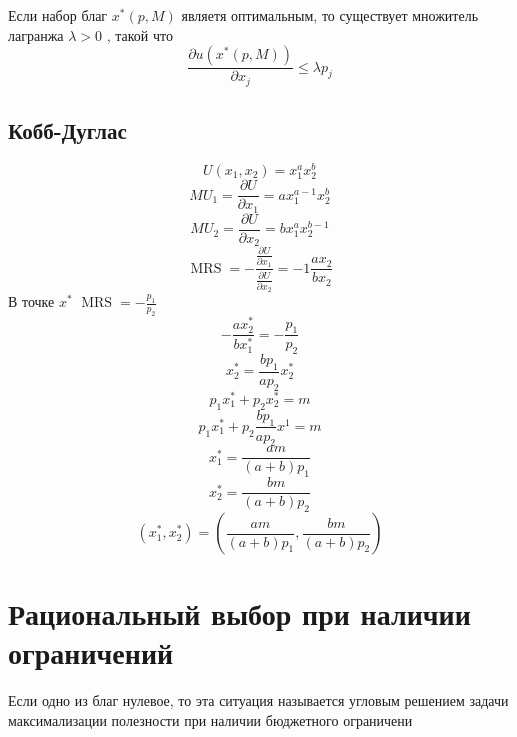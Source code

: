 \documentclass[14pt]{extarticle}
\DeclareMathOperator{\mrs}{MRS}
\begin{document}
 Если набор благ $x^{*}(p,M)$ 
 являетя оптимальным, то существует множитель лагранжа
 $\lambda > 0$ , такой что
  \begin{equation}
	  \frac{\partial u(x^{*}(p,M))}{\partial x_{j}} \le  \lambda p_{j}
 \end{equation} 
 \subsection{Кобб-Дуглас}
 \begin{equation}
 U(x_1,x_2) = x_1^{a} x_2^{b}
 \end{equation} 
 \begin{equation}
 M U_{1} = \frac{\partial U }{\partial x_1} = a x_1^{a- 1} x_2^{b}
 \end{equation} 
 \begin{equation}
 MU_2 = \frac{\partial U}{\partial x_2} = bx_1^{a} x_2^{b-1}
 \end{equation} 
 \begin{equation}
 \mrs = - \frac{\frac{\partial U}{\partial x_1}}{\frac{\partial U}{\partial x_2}} = -1\frac{ax_2}{bx_2}
 \end{equation} 
 В точке $x^{*}$ $\mrs = - \frac{p_1}{p_2}$ 
 \begin{equation}
 - \frac{a x_{2}^{*}}{b x_{1}^{*}} = -\frac{p_1}{p_2}
 \end{equation} 
 \begin{equation}
 x^{*}_{2} = \frac{b p_1}{a p_2} x_2^{*}
 \end{equation} 
 \begin{equation}
 p_1 x_1^{*} + p_2 x^{*}_{2} = m
 \end{equation} 
 \begin{equation}
 p_1 x_1^{*} + p_2 \frac{b p_1}{a p_2} x^{1} =m
 \end{equation} 
 \begin{equation}
 x_1^{*} = \frac{am}{(a+b)p_1}
 \end{equation} 
 \begin{equation}
 x^{*}_{2} = \frac{bm}{(a + b) p_2}
 \end{equation} 
 \begin{equation}
	 (x_1^{*}, x_2^{*}) = 
	 \left(\frac{am}{(a+b) p_1},\frac{bm}{(a+b)p_2}\right)
 \end{equation} 
 \section{Рациональный выбор при наличии ограничений}
 Если одно из благ нулевое, то эта ситуация
 называется угловым решением
 задачи максимализации полезности при наличии
 бюджетного ограничени
\end{document}
